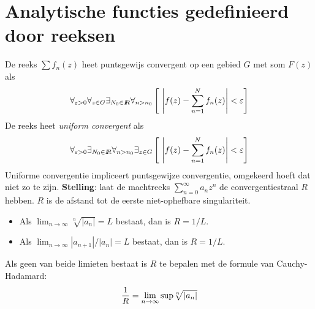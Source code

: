 \documentclass[twoside]{report}
\begin{document}
\section{Analytische functies gedefinieerd door reeksen}
De reeks $\sum f_n(z)$ heet puntsgewijs convergent op een gebied $G$ met som
$F(z)$ als
\[
\forall_{\varepsilon>0}\forall_{z\in G}\exists_{N_0\in I\hspace{-1mm}R}\forall_{n>n_0}
\left[~\left|f(z)-\sum_{n=1}^Nf_n(z)\right|<\varepsilon\right]
\]
De reeks heet {\it uniform convergent} als
\[
\forall_{\varepsilon>0}\exists_{N_0\in I\hspace{-1mm}R}\forall_{n>n_0}\exists_{z\in G}
\left[~\left|f(z)-\sum_{n=1}^Nf_n(z)\right|<\varepsilon\right]
\]
Uniforme convergentie impliceert puntsgewijze convergentie, omgekeerd hoeft
dat niet zo te zijn.
\npar
{\bf Stelling}: laat de machtreeks $\sum\limits_{n=0}^\infty a_nz^n$ de
convergentiestraal $R$ hebben. $R$ is de afstand tot de eerste niet-ophefbare
singulariteit.
\begin{itemize}
\item Als $\displaystyle\lim_{n\rightarrow\infty}\sqrt[n]{|a_n|}=L$ bestaat, dan is $R=1/L$.
\item Als $\displaystyle\lim_{n\rightarrow\infty}|a_{n+1}|/|a_n|=L$ bestaat, dan is $R=1/L$.
\end{itemize}
Als geen van beide limieten bestaat is $R$ te bepalen met de formule van
Cauchy-Hadamard:
\[
\frac{1}{R}=\lim_{n\rightarrow\infty}{\rm sup}\sqrt[n]{|a_n|}
\]
\end{document}
